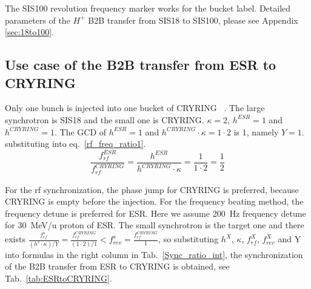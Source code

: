 The SIS100 revolution frequency marker works for the bucket label. Detailed parameters of the $H^{+}$ B2B transfer from SIS18 to SIS100, please see Appendix \ref{sec:18to100}.
\subsection{Use case of the B2B transfer from ESR to CRYRING}
Only one bunch is injected into one bucket of CRYRING ~\cite{herfurth_low_2013, lestinsky_cryring_2015}. The large synchrotron is SIS18 and the small one is CRYRING. $\kappa=2$, $h^{\mathit{ESR}}=1$ and $h^{\mathit{CRYRING}}=1$. The GCD of $h^{\mathit{ESR}}=1$ and $h^{\mathit{CRYRING}} \cdot \kappa=1\cdot 2$ is 1, namely $Y=1$. substituting into eq.~\ref{rf_freq_ratio1}. 
\begin{equation}
\frac{f_{\mathit{rf}}^{\mathit{ESR}}}{f_{\mathit{rf}}^{\mathit{CRYRING}}}= \frac {h^{\mathit{ESR}}}{h^{\mathit{CRYRING}} \cdot \kappa}= \frac{1}{1 \cdot 2}=\frac{1}{2}
\end{equation}

For the rf synchronization, the phase jump for CRYRING is preferred, because CRYRING is empty before the injection. For the frequency beating method, the frequency detune is preferred for ESR. Here we assume \SI{200}{Hz} frequency detune for \SI{30}{MeV/\atomicmassunit} proton of ESR. The small synchrotron is the target one and there exists $\frac{f_{\mathit{rf}}^{s}}{(h^s\cdot \kappa)/Y}=\frac{f_{\mathit{rf}}^{\mathit{CRYRING}}}{(1\cdot 2)/1}< f_{\mathit{rev}}^{s}=\frac{f_{\mathit{rf}}^{\mathit{CRYRING}}}{1}$, so substituting $h^X$, $\kappa$, $f_{\mathit{rf}}^{X}$, $f_{\mathit{rev}}^{X}$ and Y into formulas in the right column in Tab.~\ref{Sync_ratio_int}, the synchronization of the B2B transfer from ESR to CRYRING is obtained, see Tab.~\ref{tab:ESRtoCRYRING}.

